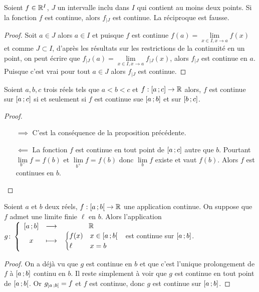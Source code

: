\begin{prop}
  Soient $f \in \mathbb{R}^I$, $J$ un intervalle inclu dans $I$ qui contient au moins deux points. Si la fonction $f$ est continue, alors $f_{|J}$ est continue. La réciproque est fausse.
\end{prop}
\begin{proof}
  Soit $a \in J$ alors $a \in I$ et puisque $f$ est continue $f(a) = \lim\limits_{x\in I, x\to a} f(x)$ et comme $J \subset I$, d'après les résultats sur les restrictions de la continuité en un point, on peut écrire que $f_{|J}(a) = \lim\limits_{x\in I, x\to a} f_{|J}(x)$, alors $f_{|J}$ est continue en $a$. Puisque c'est vrai pour tout $a \in J$ alors $f_{|J}$ est continue. 
\end{proof}
\begin{prop}
  Soient $a,b,c$ trois réels tels que $a<b<c$ et $f:\left[ a \, ;  c \right] \rightarrow \mathbb{R}$ alors, $f$ est continue sur $\left[ a \, ;  c \right]$ si et seulement si $f$ est continue sue $\left[ a \, ;  b \right]$ et sur $\left[ b \, ;  c \right]$.
\end{prop}
\begin{proof}
  \begin{itemize}
  \item[$\implies$] C'est la conséquence de la proposition précédente.
  \item[$\impliedby$] La fonction $f$ est continue en tout point de $\left[ a \, ;  c \right]$ autre que $b$. Pourtant $\lim\limits_{b^{-}} f=f(b)$ et $\lim\limits_{b^{+}} f=f(b)$ donc $\lim\limits_{b} f$ existe et vaut $f(b)$. Alors $f$ est continues en $b$.
  \end{itemize}
\end{proof}
\begin{prop}
  Soient $a$ et $b$ deux réels, $f:\left[ a \, ;  b \right[ \rightarrow \mathbb{R}$ une application continue. On suppose que $f$ admet une limite finie $\ell$ en $b$. Alors l'application $g\colon \left\{\begin{array}{ccc} \left[ a \, ;  b \right] & \longrightarrow &\mathbb{R}\\ x & \longmapsto & \begin{cases}f(x) & x \in \left[ a \, ;  b \right[ \\ \ell & x=b\end{cases} \end{array} \right.$ est continue sur $\left[ a \, ;  b \right]$.
\end{prop}
\begin{proof}
  On a déjà vu que $g$ est continue en $b$ et que c'est l'unique prolongement de $f$ à $\left[ a \, ;  b \right]$ continu en $b$. Il reste simplement à voir que $g$ est continue en tout point de $\left[ a \, ;  b \right[$. Or $g_{\left[ a \, ;  b \right[}=f$ et $f$ est continue, donc $g$ est continue sur $\left[ a \, ;  b \right]$.
\end{proof}


